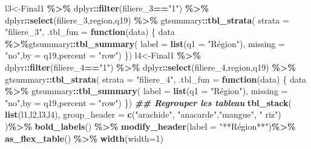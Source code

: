 \documentclass[
]{article}
\newenvironment{Shaded}{\begin{snugshade}}{\end{snugshade}}
\newcommand{\AttributeTok}[1]{\textcolor[rgb]{0.13,0.29,0.53}{#1}}
\newcommand{\ControlFlowTok}[1]{\textcolor[rgb]{0.13,0.29,0.53}{\textbf{#1}}}
\newcommand{\DecValTok}[1]{\textcolor[rgb]{0.00,0.00,0.81}{#1}}
\newcommand{\DocumentationTok}[1]{\textcolor[rgb]{0.56,0.35,0.01}{\textbf{\textit{#1}}}}
\newcommand{\FunctionTok}[1]{\textcolor[rgb]{0.13,0.29,0.53}{\textbf{#1}}}
\newcommand{\NormalTok}[1]{#1}
\newcommand{\OtherTok}[1]{\textcolor[rgb]{0.56,0.35,0.01}{#1}}
\newcommand{\SpecialCharTok}[1]{\textcolor[rgb]{0.81,0.36,0.00}{\textbf{#1}}}
\newcommand{\StringTok}[1]{\textcolor[rgb]{0.31,0.60,0.02}{#1}}
\begin{document}
\begin{Shaded}
\begin{Highlighting}[]
\NormalTok{l3}\OtherTok{\textless{}{-}}\NormalTok{Final1 }\SpecialCharTok{\%\textgreater{}\%}
\NormalTok{  dplyr}\SpecialCharTok{::}\FunctionTok{filter}\NormalTok{(filiere\_3}\SpecialCharTok{==}\StringTok{"1"}\NormalTok{) }\SpecialCharTok{\%\textgreater{}\%} 
\NormalTok{  dplyr}\SpecialCharTok{::}\FunctionTok{select}\NormalTok{(filiere\_3,region,q19) }\SpecialCharTok{\%\textgreater{}\%}
\NormalTok{  gtsummary}\SpecialCharTok{::}\FunctionTok{tbl\_strata}\NormalTok{(}
    \AttributeTok{strata =} \StringTok{"filiere\_3"}\NormalTok{, }\AttributeTok{.tbl\_fun =} \ControlFlowTok{function}\NormalTok{(data) \{}
\NormalTok{      data }\SpecialCharTok{\%\textgreater{}\%}\NormalTok{gtsummary}\SpecialCharTok{::}\FunctionTok{tbl\_summary}\NormalTok{(}
           \AttributeTok{label =} \FunctionTok{list}\NormalTok{(}\AttributeTok{q1 =} \StringTok{"Région"}\NormalTok{),}
          \AttributeTok{missing =} \StringTok{"no"}\NormalTok{,}\AttributeTok{by =}\NormalTok{ q19,}\AttributeTok{percent =} \StringTok{"row"}\NormalTok{) \})}
\NormalTok{l4}\OtherTok{\textless{}{-}}\NormalTok{Final1 }\SpecialCharTok{\%\textgreater{}\%}
\NormalTok{  dplyr}\SpecialCharTok{::}\FunctionTok{filter}\NormalTok{(filiere\_4}\SpecialCharTok{==}\StringTok{"1"}\NormalTok{) }\SpecialCharTok{\%\textgreater{}\%} 
\NormalTok{ dplyr}\SpecialCharTok{::}\FunctionTok{select}\NormalTok{(filiere\_4,region,q19) }\SpecialCharTok{\%\textgreater{}\%}
\NormalTok{  gtsummary}\SpecialCharTok{::}\FunctionTok{tbl\_strata}\NormalTok{(}
    \AttributeTok{strata =} \StringTok{"filiere\_4"}\NormalTok{, }\AttributeTok{.tbl\_fun =} \ControlFlowTok{function}\NormalTok{(data) \{}
\NormalTok{      data }\SpecialCharTok{\%\textgreater{}\%}\NormalTok{ gtsummary}\SpecialCharTok{::}\FunctionTok{tbl\_summary}\NormalTok{(}
          \AttributeTok{label =} \FunctionTok{list}\NormalTok{(}\AttributeTok{q1 =} \StringTok{"Région"}\NormalTok{),}
          \AttributeTok{missing =} \StringTok{"no"}\NormalTok{,}\AttributeTok{by =}\NormalTok{ q19,}\AttributeTok{percent =} \StringTok{"row"}\NormalTok{) \})}
\DocumentationTok{\#\# Regrouper les tableau}
\FunctionTok{tbl\_stack}\NormalTok{(}
  \FunctionTok{list}\NormalTok{(l1,l2,l3,l4),}
 \AttributeTok{group\_header =} \FunctionTok{c}\NormalTok{(}\StringTok{"arachide"}\NormalTok{,}
                  \StringTok{"anacarde"}\NormalTok{,}\StringTok{"mangue"}\NormalTok{,}
                  \StringTok{" riz"}\NormalTok{)}
\NormalTok{                  )}\SpecialCharTok{\%\textgreater{}\%} 
  \FunctionTok{bold\_labels}\NormalTok{() }\SpecialCharTok{\%\textgreater{}\%} 
  \FunctionTok{modify\_header}\NormalTok{(}\AttributeTok{label =} \StringTok{"**Région**"}\NormalTok{)}\SpecialCharTok{\%\textgreater{}\%}
  \FunctionTok{as\_flex\_table}\NormalTok{() }\SpecialCharTok{\%\textgreater{}\%} 
  \FunctionTok{width}\NormalTok{(}\AttributeTok{width=}\DecValTok{1}\NormalTok{)}
\end{Highlighting}
\end{Shaded}
\end{document}
